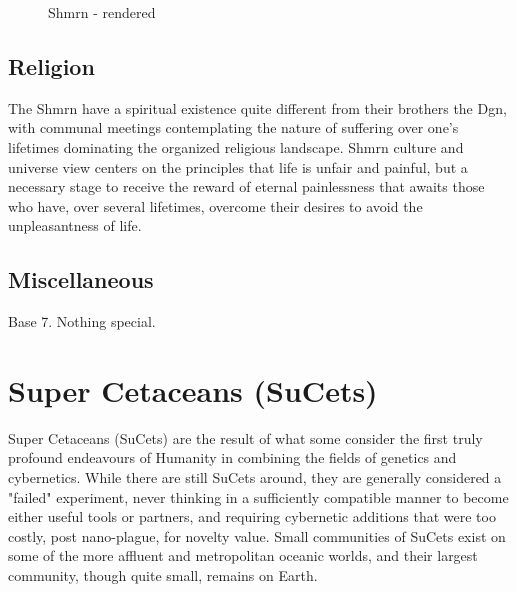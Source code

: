 \begin{figure}
\begin{center}
    \caption{Shmrn - rendered}
    \label{fig:Shmrn-render}
\end{center}
\end{figure}

\subsection{Religion}
The Shmrn have a spiritual existence quite different from their
brothers the Dgn, with communal meetings contemplating the nature of
suffering over one's lifetimes dominating the organized religious
landscape. Shmrn culture and universe view centers on the principles
that life is unfair and painful, but a necessary stage to receive the
reward of eternal painlessness that awaits those who have, over
several lifetimes, overcome their desires to avoid the unpleasantness
of life.

\subsection{Miscellaneous}
Base 7. Nothing special. 

\section{Super Cetaceans (SuCets)}

Super Cetaceans (SuCets) are the result of what some consider the
first truly profound endeavours of Humanity in combining the fields of
genetics and cybernetics. While there are still SuCets around, they
are generally considered a "failed" experiment, never thinking in a
sufficiently compatible manner to become either useful tools or
partners, and requiring cybernetic additions that were too costly,
post nano-plague, for novelty value. Small communities of SuCets exist
on some of the more affluent and metropolitan oceanic worlds, and
their largest community, though quite small, remains on Earth.

